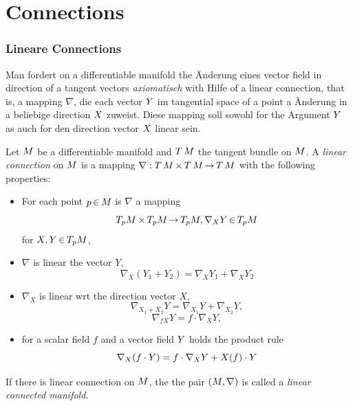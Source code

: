 \documentclass[11pt,twoside]{article}
\begin{document}
\newpage
\thispagestyle{empty}
\part{Connections}                                                             %

\section{Lineare Connections}
Man fordert on a differentiable manifold the \"Anderung
eines vector field in direction of a tangent vectors \textit{axiomatisch}
with Hilfe of a linear connection,
that is,
a mapping $\nabla$,
die each vector $Y$ im tangential space of a point a \"Anderung
in a beliebige direction $X$ zuweist.
Diese mapping soll sowohl for the Argument $Y$ as auch for den
direction vector $X$ linear sein.

\begin{definition}
Let ${M}$ be a differentiable manifold
and $T\,{M}$ the tangent bundle on ${M}$.
A \textit{linear connection} on ${M}$ is a mapping
$\nabla: T\,{M} {\,\times\,} T\,{M} {\,\to\,} T\,{M}$
with the following properties:
\begin{itemize}[leftmargin=15pt]
\item[1.]
For each point $p {\,\in\,} {M}$ is $\nabla$ a mapping
\[
T_p {M} {\,\times\,} T_p {M} {\,\to\,} T_p {M}, \nabla_X Y {\,\in\,} T_p {M}
\]
for $X,Y {\,\in\,} T_p {M}$,
\item[2.]
$\nabla$ is linear {\wrt} the vector $Y$,
\[
\nabla_X (Y_1 + Y_2) = \nabla_X Y_1 + \nabla_X Y_2
\]
\item[3.]
$\nabla_X$ is linear {wrt} the direction vector $X$,
\[
\nabla_{X_1 + X_2} Y = \nabla_{X_1} Y + \nabla_{X_2} Y,
\]
\[
\nabla_{fX} Y = f \cdot \nabla_X Y,
\]
\item[1.]
for a scalar field $f$ and a vector field $Y$ holds the product rule
\[
\nabla_X (f \cdot Y) = f \cdot \nabla_X Y + X(f) \cdot Y
\]
\end{itemize}
\end{definition}

\subparagraph{}
If there is linear connection on ${M}$,
the the pair $({M},\nabla)$ is called a \textit{linear connected manifold}.
\end{document}
